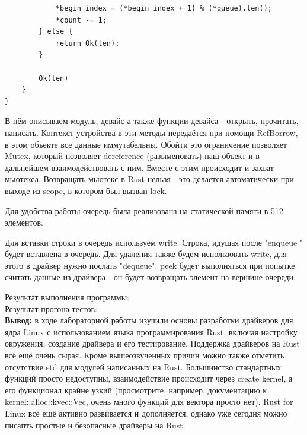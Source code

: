 \documentclass[a4paper,14pt]{extarticle}
\begin{document}
\begin{verbatim}
            *begin_index = (*begin_index + 1) % (*queue).len();
            *count -= 1;
        } else {
            return Ok(len);
        }
        
        Ok(len)
    }
}
\end{verbatim}

В нём описываем модуль, девайс а также функции девайса - открыть, прочитать, написать.
Контекст устройства в эти методы передаётся при помощи RefBorrow, в этом объекте
все данные иммутабельны. Обойти это ограничение позволяет Mutex, который позволяет
dereference (разыменовать) наш объект и в дальнейшем взаимодействовать с ним.
Вместе с этим происходит и захват мьютекса. Возвращать мьютекс в Rust нельзя - 
это делается автоматически при выходе из scope, в котором был вызван lock. 

Для удобства работы очередь была реализована на статической памяти в 512 элементов.

Для вставки строки в очередь используем write. Строка, идущая после "enqueue " будет
вставлена в очередь. Для удаления также будем использовать write, для этого в драйвер
нужно послать "dequeue". peek будет выполняться при попытке считать данные из драйвера - 
он будет возвращать элемент на вершине очереди.

Результат выполнения программы:\\
Результат прогона тестов:\\


\textbf{Вывод: } в ходе лабораторной работы изучили основы разработки драйверов для ядра Linux с использованием языка
программирования Rust, включая настройку окружения, создание драйвера и его тестирование. Поддержка драйверов на Rust 
всё ещё очень сырая. Кроме вышеозвученных причин можно также отметить отсутствие std для модулей написанных на Rust. 
Большинство стандартных функций просто недоступны, взаимодействие происходит через create kernel, а его функционал
крайне узкий (просмотрите, например, документацию к kernel::alloc::kvec::Vec, очень много функций для вектора просто нет).
Rust for Linux всё ещё активно развивается и дополняется, однако уже сегодня можно писапть простые и безопасные драйверы
на Rust.
\end{document}
